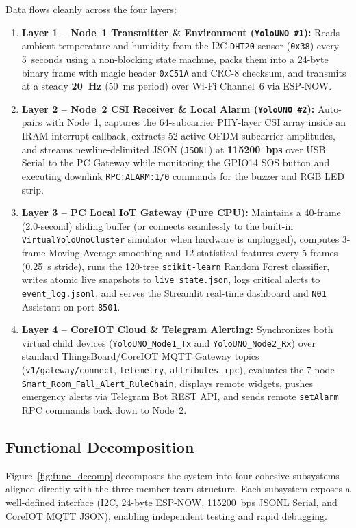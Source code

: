 \documentclass{hcmut-report}
\begin{document}
Data flows cleanly across the four layers:
\begin{enumerate}
  \item \textbf{Layer 1 -- Node~1 Transmitter \& Environment (\texttt{YoloUNO \#1}):} Reads ambient temperature and humidity from the I2C \texttt{DHT20} sensor (\texttt{0x38}) every 5~seconds using a non-blocking state machine, packs them into a 24-byte binary frame with magic header \texttt{0xC51A} and CRC-8 checksum, and transmits at a steady \textbf{20~Hz} (50~ms period) over Wi-Fi Channel~6 via ESP-NOW.
  \item \textbf{Layer 2 -- Node~2 CSI Receiver \& Local Alarm (\texttt{YoloUNO \#2}):} Auto-pairs with Node~1, captures the 64-subcarrier PHY-layer CSI array inside an IRAM interrupt callback, extracts 52 active OFDM subcarrier amplitudes, and streams newline-delimited JSON (\texttt{JSONL}) at \textbf{115200~bps} over USB Serial to the PC Gateway while monitoring the GPIO14 SOS button and executing downlink \texttt{RPC:ALARM:1/0} commands for the buzzer and RGB LED strip.
  \item \textbf{Layer 3 -- PC Local IoT Gateway (Pure CPU):} Maintains a 40-frame (2.0-second) sliding buffer (or connects seamlessly to the built-in \texttt{VirtualYoloUnoCluster} simulator when hardware is unplugged), computes 3-frame Moving Average smoothing and 12 statistical features every 5 frames (0.25~s stride), runs the 120-tree \texttt{scikit-learn} Random Forest classifier, writes atomic live snapshots to \texttt{live\_state.json}, logs critical alerts to \texttt{event\_log.jsonl}, and serves the Streamlit real-time dashboard and \texttt{N01} Assistant on port \texttt{8501}.
  \item \textbf{Layer 4 -- CoreIOT Cloud \& Telegram Alerting:} Synchronizes both virtual child devices (\texttt{YoloUNO\_Node1\_Tx} and \texttt{YoloUNO\_Node2\_Rx}) over standard ThingsBoard/CoreIOT MQTT Gateway topics (\texttt{v1/gateway/connect}, \texttt{telemetry}, \texttt{attributes}, \texttt{rpc}), evaluates the 7-node \texttt{Smart\_Room\_Fall\_Alert\_RuleChain}, displays remote widgets, pushes emergency alerts via Telegram Bot REST API, and sends remote \texttt{setAlarm} RPC commands back down to Node~2.
\end{enumerate}

\subsection{Functional Decomposition}
Figure~\ref{fig:func_decomp} decomposes the system into four cohesive subsystems aligned directly with the three-member team structure. Each subsystem exposes a well-defined interface (I2C, 24-byte ESP-NOW, 115200~bps JSONL Serial, and CoreIOT MQTT JSON), enabling independent testing and rapid debugging.
\end{document}
